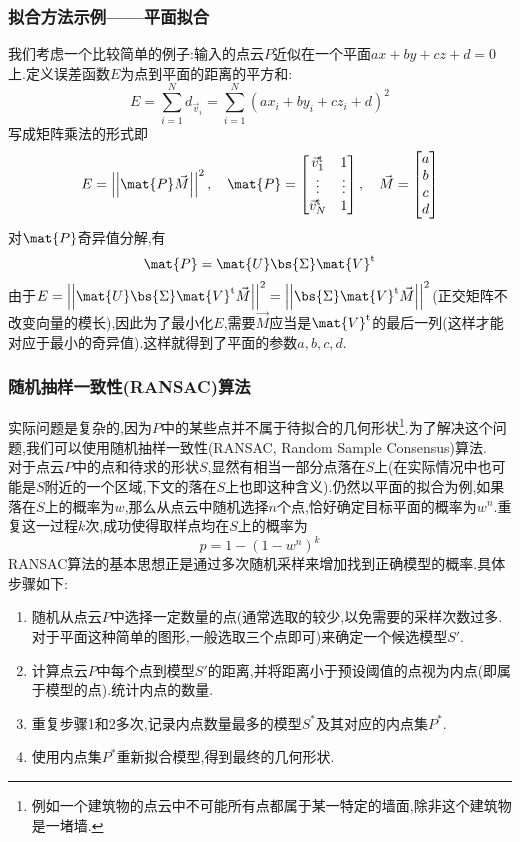 \documentclass{ctexart}
\begin{document}
\subsubsection{拟合方法示例——平面拟合}
我们考虑一个比较简单的例子:输入的点云$P$近似在一个平面$ax+by+cz+d=0$上.定义误差函数$E$为点到平面的距离的平方和:
\[E=\sum_{i=1}^{N}d_{\vec{v}_i}=\sum_{i=1}^{N}\left(ax_i+by_i+cz_i+d\right)^2\]
写成矩阵乘法的形式即
\[E=\left|\left|\mat{P}\vec{M}\right|\right|^2,\quad\mat{P}=\begin{bmatrix}
    \vec{v}_1^{\text{t}}&1\\
    \vdots&\vdots\\
    \vec{v}_N^{\text{t}}&1
\end{bmatrix},\quad\vec{M}=\begin{bmatrix}
    a\\b\\c\\d
\end{bmatrix}\]
对$\mat{P}$奇异值分解,有
\[\mat{P}=\mat{U}\bs{\Sigma}\mat{V}^{\text{t}}\]
由于$E=\left|\left|\mat{U}\bs{\Sigma}\mat{V}^{\text{t}}\vec{M}\right|\right|^2=\left|\left|\bs{\Sigma}\mat{V}^{\text{t}}\vec{M}\right|\right|^2$(正交矩阵不改变向量的模长),因此为了最小化$E$,需要$\vec{M}$应当是$\mat{V}^{\text{t}}$的最后一列(这样才能对应于最小的奇异值).这样就得到了平面的参数$a,b,c,d$.
\subsubsection{随机抽样一致性(RANSAC)算法}
实际问题是复杂的,因为$P$中的某些点并不属于待拟合的几何形状\footnote{例如一个建筑物的点云中不可能所有点都属于某一特定的墙面,除非这个建筑物是一堵墙.}.为了解决这个问题,我们可以使用随机抽样一致性(RANSAC, Random Sample Consensus)算法.\\
\indent 对于点云$P$中的点和待求的形状$S$,显然有相当一部分点落在$S$上(在实际情况中也可能是$S$附近的一个区域,下文的落在$S$上也即这种含义).仍然以平面的拟合为例,如果落在$S$上的概率为$w$,那么从点云中随机选择$n$个点,恰好确定目标平面的概率为$w^n$.重复这一过程$k$次,成功使得取样点均在$S$上的概率为
\[p=1-\left(1-w^n\right)^k\]
RANSAC算法的基本思想正是通过多次随机采样来增加找到正确模型的概率.具体步骤如下:
\begin{enumerate}[label=\tbf{\arabic*.},topsep=0pt,parsep=0pt,itemsep=0pt,partopsep=0pt]
    \item 随机从点云$P$中选择一定数量的点(通常选取的较少,以免需要的采样次数过多.对于平面这种简单的图形,一般选取三个点即可)来确定一个候选模型$S'$.
    \item 计算点云$P$中每个点到模型$S'$的距离,并将距离小于预设阈值的点视为内点(即属于模型的点).统计内点的数量.
    \item 重复步骤1和2多次,记录内点数量最多的模型$S^\ast$及其对应的内点集$P^\ast$.
    \item 使用内点集$P^\ast$重新拟合模型,得到最终的几何形状.
\end{enumerate}
\end{document}
